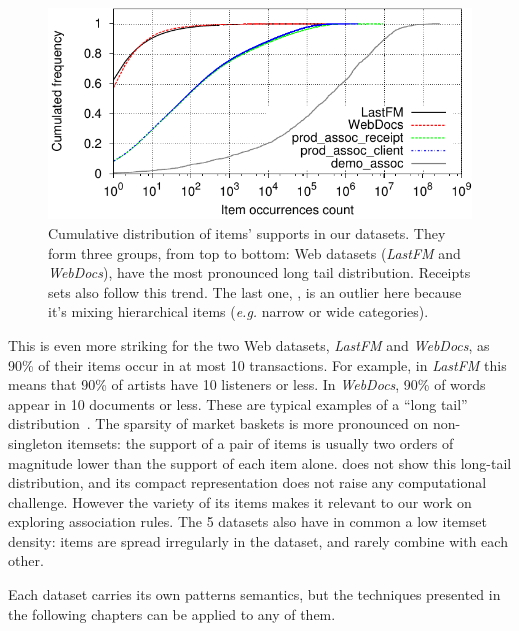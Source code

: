 \begin{figure}
	\centering
	\includegraphics{fig/itemFreqCumulativeDist/itemFreqCumulativeDistributions.pdf}
	\caption{\label{fig:itemFreqDist}
		Cumulative distribution of items' supports in our datasets.
		They form three groups, from top to bottom:
			Web datasets ({\em LastFM} and {\em WebDocs}), have the most pronounced long tail distribution.
			Receipts sets also follow this trend.
			The last one, \demoassoc, is an outlier here because it's mixing hierarchical items
			({\em e.g.} narrow or wide categories).
		}
\end{figure}

This is even more striking for the two Web datasets, {\em LastFM} and {\em WebDocs},
as 90\% of their items occur in at most 10 transactions.
For example, in {\em LastFM} this means that 90\% of artists have 10 listeners or less.
In {\em WebDocs}, 90\% of words appear in 10 documents or less.
These are typical examples of a ``long tail'' distribution~\cite{GoelWSDM10}.
The sparsity of market baskets is more pronounced on non-singleton itemsets:
the support of a pair of items is usually two orders of magnitude lower than
the support of each item alone.
\demoassoc does not show this long-tail distribution,
and its compact representation does not raise any computational challenge.
However the variety of its items makes it relevant to our work on exploring association rules.
The 5 datasets also have in common a low itemset density:
items are spread irregularly in the dataset, and rarely combine with each other.

Each dataset carries its own patterns semantics,
but the techniques presented in the following chapters can be applied to any of them.

